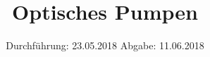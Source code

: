 

\subject{V21}
\title{Optisches Pumpen}
\date{
  Durchführung: 23.05.2018
  \hspace{3em}
  Abgabe: 11.06.2018
}



\maketitle
\newpage

%
%


%



\printbibliography


